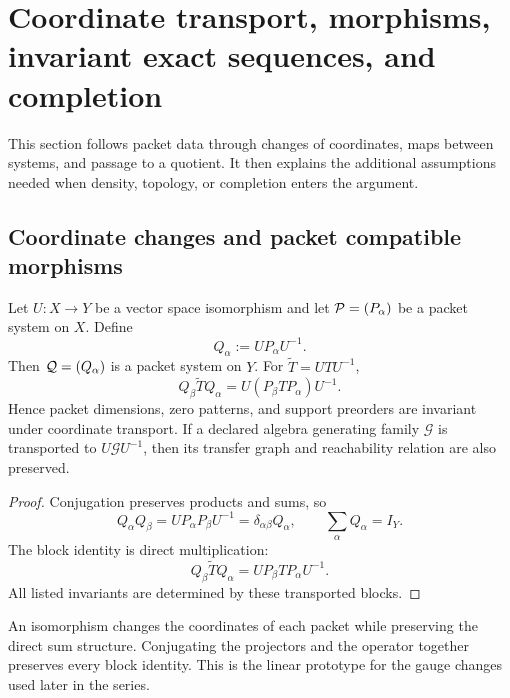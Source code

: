 \section{Coordinate transport, morphisms, invariant exact sequences, and completion}
\begin{readerroadmap}
This section follows packet data through changes of coordinates, maps between systems, and passage to a quotient.  It then explains the additional assumptions needed when density, topology, or completion enters the argument.
\end{readerroadmap}
\subsection{Coordinate changes and packet compatible morphisms}

\begin{theorem}
\label{thm:coordinate-transport}
Let $U:X\to Y$ be a vector space isomorphism and let $\mathcal P=(P_\alpha)$ be a packet system on $X$.  Define
\[
Q_\alpha:=UP_\alpha U^{-1}.
\]
Then $\mathcal Q=(Q_\alpha)$ is a packet system on $Y$.  For $\widetilde T=UTU^{-1}$,
\[
\boxed{
Q_\beta\widetilde TQ_\alpha
=
U(P_\beta TP_\alpha)U^{-1}.
}
\]
Hence packet dimensions, zero patterns, and support preorders are invariant under coordinate transport.  If a declared algebra generating family $\mathcal G$ is transported to $U\mathcal G U^{-1}$, then its transfer graph and reachability relation are also preserved.
\end{theorem}

\begin{proof}
Conjugation preserves products and sums, so
\[
Q_\alpha Q_\beta
=UP_\alpha P_\beta U^{-1}
=\delta_{\alpha\beta}Q_\alpha,
\qquad
\sum_\alpha Q_\alpha=I_Y.
\]
The block identity is direct multiplication:
\[
Q_\beta\widetilde TQ_\alpha
=UP_\beta TP_\alpha U^{-1}.
\]
All listed invariants are determined by these transported blocks.
\end{proof}

\begin{interpretation}
An isomorphism changes the coordinates of each packet while preserving the direct sum structure.  Conjugating the projectors and the operator together preserves every block identity.  This is the linear prototype for the gauge changes used later in the series.
\end{interpretation}


